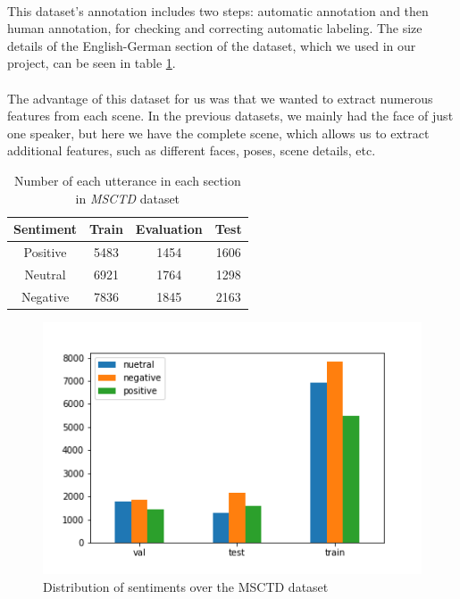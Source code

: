 \paragraph{} This dataset's annotation includes two steps: automatic annotation and then human annotation, for checking and correcting automatic labeling. The size details of the English-German section of the dataset, which we used in our project, can be seen in table \ref{table:MSCTD}.
\paragraph{} The advantage of this dataset for us was that we wanted to extract numerous features from each scene. In the previous datasets, we mainly had the face of just one speaker, but here we have the complete scene, which allows us to extract additional features, such as different faces, poses, scene details, etc.

\begin{center}
	\begin{table}[h!]
		\begin{tabular}{||c| c c c||} 
			\hline
			Sentiment & Train & Evaluation & Test \\ [0.5ex] 
			\hline\hline
			Positive & 5483 & 1454 & 1606 \\
			\hline
			Neutral & 6921 & 1764 & 1298 \\
			\hline
			Negative & 7836 & 1845 & 2163 \\ [1ex] 
			\hline
		\end{tabular}
	\caption{Number of each utterance in each section in \textit{MSCTD} dataset}
	\label{table:MSCTD}
	\end{table}
\end{center}


\begin{figure}[t]
	\centering
	\includegraphics[width=\linewidth]{fig/MSCTDhist}
	\caption{Distribution of sentiments over the MSCTD dataset}
	\label{fig:MSCTDhist}
\end{figure}


